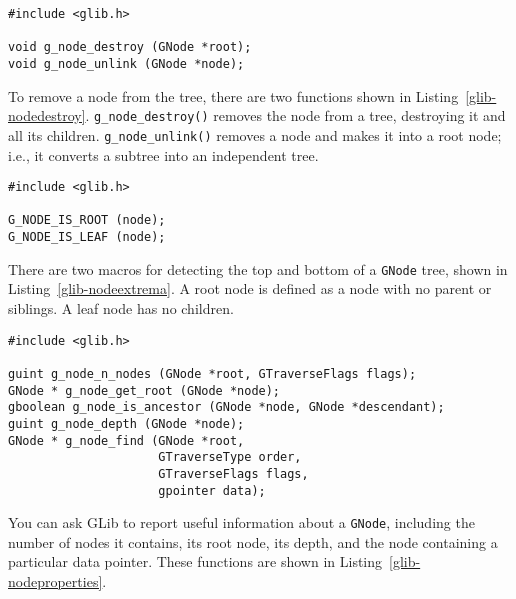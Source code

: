 \begin{lstlisting}[float, caption={Destroying a \lstinline{GNode}}, label=glib-nodedestroy]
#include <glib.h>

void g_node_destroy (GNode *root);
void g_node_unlink (GNode *node);
\end{lstlisting}

To remove a node from the tree, there are two functions shown in Listing~\ref{glib-nodedestroy}. \lstinline{g_node_destroy()} removes the node from a tree, destroying it and all its children. \lstinline{g_node_unlink()} removes a node and makes it into a root node; i.e., it converts a subtree into an independent tree.

\begin{lstlisting}[float, caption={Predicates for \lstinline{GNode}}, label=glib-nodeextrema]
#include <glib.h>

G_NODE_IS_ROOT (node);
G_NODE_IS_LEAF (node);
\end{lstlisting}

There are two macros for detecting the top and bottom of a \lstinline{GNode} tree, shown in Listing~\ref{glib-nodeextrema}. A root node is defined as a node with no parent or siblings. A leaf node has no children.

\begin{lstlisting}[float, caption={\lstinline{GNode} properties}, label=glib-nodeproperties]
#include <glib.h>

guint g_node_n_nodes (GNode *root, GTraverseFlags flags);
GNode * g_node_get_root (GNode *node);
gboolean g_node_is_ancestor (GNode *node, GNode *descendant);
guint g_node_depth (GNode *node);
GNode * g_node_find (GNode *root,
                     GTraverseType order,
                     GTraverseFlags flags,
                     gpointer data);
\end{lstlisting}

You can ask GLib to report useful information about a \lstinline{GNode}, including the number of nodes it contains, its root node, its depth, and the node containing a particular data pointer. These functions are shown in Listing~\ref{glib-nodeproperties}.

